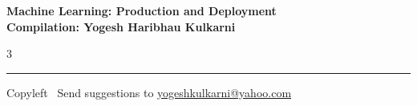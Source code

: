 \documentclass[8pt,landscape]{article}
\begin{document}
\footnotesize


\begin{center}
\Large{\textbf{Machine Learning: Production and Deployment\\ Compilation: Yogesh Haribhau Kulkarni}}
\end{center}

\begin{multicols}{3}

\end{multicols}

\rule{\linewidth}{0.25pt}
\scriptsize
Copyleft \textcopyleft\  Send suggestions to
\href{http://www.yogeshkulkarni.com}{yogeshkulkarni@yahoo.com}
\end{document}
